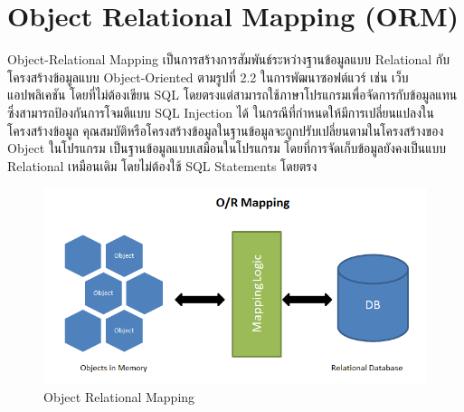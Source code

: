 \section{Object Relational Mapping (ORM)}
Object-Relational Mapping \cite{orm} เป็นการสร้างการสัมพันธ์ระหว่างฐานข้อมูลแบบ Relational กับโครงสร้างข้อมูลแบบ Object-Oriented 
ตามรูปที่ 2.2 ในการพัฒนาซอฟต์แวร์ เช่น เว็บแอปพลิเคชัน โดยที่ไม่ต้องเขียน SQL โดยตรงแต่สามารถใช้ภาษาโปรแกรมเพื่อจัดการกับข้อมูลแทน 
ซึ่งสามารถป้องกันการโจมตีแบบ SQL Injection ได้ ในกรณีที่กำหนดให้มีการเปลี่ยนแปลงในโครงสร้างข้อมูล 
คุณสมบัติหรือโครงสร้างข้อมูลในฐานข้อมูลจะถูกปรับเปลี่ยนตามในโครงสร้างของ Object ในโปรแกรม เป็นฐานข้อมูลแบบเสมือนในโปรแกรม 
โดยที่การจัดเก็บข้อมูลยังคงเป็นแบบ Relational เหมือนเดิม โดยไม่ต้องใช้ SQL Statements โดยตรง
\begin{figure}[ht]
  \begin{center}
  \includegraphics[scale=0.3]{resources/ORM.png}
  \end{center}
  \caption[Object Relational Mapping]{Object Relational Mapping}
  \label{fig:orm}
\end{figure}

